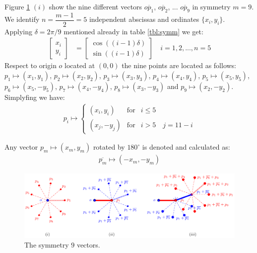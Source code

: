\documentclass[11pt]{article}
\begin{document}
Figure \ref{fig:vectors-a} $(i)$ show the nine different vectors $\overline{op_1}$, $\overline{op_2}$, ... $\overline{op_9}$ in symmetry $m=9$. We identify $n = \dfrac{m-1}2 = 5$ independent abscissas and ordinates $\{ x_i, y_i \}$. Applying $\delta = 2\pi/9$ mentioned already in table \ref{tbl:symm} we get:
\begin{align}
\left[ \begin{array}{c} x_i \\ y_i \end{array} \right] &= 
\left[ \begin{array}{c} \cos((i-1)\delta) \\ \sin((i-1)\delta) \end{array} \right]
 \quad i = 1,2,...,n=5
\end{align}
Respect to origin $o$ located at $(0,0)$ the nine points are located as follows:
$p_1 \mapsto (x_1,y_1)$,
$p_2 \mapsto (x_2,y_2)$,
$p_3 \mapsto (x_3,y_3)$,
$p_4 \mapsto (x_4,y_4)$,
$p_5 \mapsto (x_5,y_5)$,
$p_6 \mapsto (x_5,-y_5)$,
$p_7 \mapsto (x_4,-y_4)$,
$p_8 \mapsto (x_3,-y_3)$ and
$p_9 \mapsto (x_2,-y_2)$. Simplyfing we have:
\begin{align}
p_i \mapsto \left\{ \begin{array}{ccl}
 (x_i,y_i) & \mbox{for} & i \leq 5 \\
 (x_j, -y_j) & \mbox{for} & i > 5 \quad j = 11-i
 \end{array}\right.
\end{align}

Any vector $p_m \mapsto (x_m, y_m)$ rotated by $180^\circ$ is denoted and calculated as:
\begin{align}
\overline{p_m} \mapsto (-x_m, -y_m)
\end{align}

\begin{figure}[H]
\centering
\includegraphics[scale=1]{vectors-a}
\caption{The symmetry $9$ vectors.}
\label{fig:vectors-a}
\end{figure}
\end{document}
